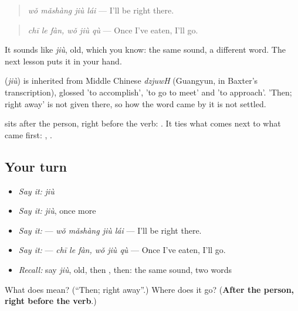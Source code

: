 \begin{quote}
\textbf{} \emph{wǒ mǎshàng jiù lái} — I'll be right there.
\end{quote}

\begin{quote}
\textbf{ } \emph{chī le fàn, wǒ jiù qù} — Once I've eaten, I'll go.
\end{quote}

It sounds like \emph{jiù}, old, which you know: the same sound, a different word. The next lesson puts it in your hand.

\begin{cousinweb}
\textbf{} (\emph{jiù}) is inherited from Middle Chinese \emph{dzjuwH} (Guangyun, in Baxter's transcription), glossed 'to accomplish', 'to go to meet' and 'to approach'. 'Then; right away' is not given there, so how the word came by it is not settled.
\end{cousinweb}

\begin{grammarlens}[title={What you've built}]
 sits after the person, right before the verb: . It ties what comes next to what came first: , .
\end{grammarlens}

\subsection*{Your turn}
\begin{itemize}
\raggedright
  \item \emph{Say it:} \emph{jiù}
  \item \emph{Say it:} \emph{jiù}, once more
  \item \emph{Say it:}  — \emph{wǒ mǎshàng jiù lái} — I'll be right there.
  \item \emph{Say it:}   — \emph{chī le fàn, wǒ jiù qù} — Once I've eaten, I'll go.
  \item \emph{Recall:} say \emph{jiù}, old, then , then: the same sound, two words
\end{itemize}

\begin{tcolorbox}[breakable,colback=teal!4,colframe=teal!35!black,title={Before you move on}]
What does  mean? (\textquotedblleft{}Then; right away\textquotedblright{}.) Where does it go? (\textbf{After the person, right before the verb}.)
\end{tcolorbox}
